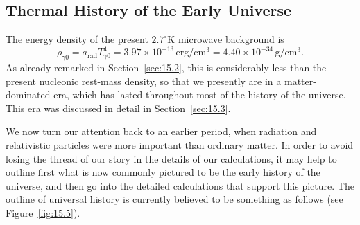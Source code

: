 
\subsection{Thermal History of the Early Universe}\label{sec:15.6}

The energy density of the present \(2.7^\circ\mathrm K\) microwave background
is
\begin{equation}
  \rho_{\gamma0}
  =
  a_{\mathrm{rad}}T_{\gamma0}^4
  =
  3.97\times10^{-13}\,\mathrm{erg/cm^3}
  =
  4.40\times10^{-34}\,\mathrm{g/cm^3}.
  \tag{15.6.1}\label{eq:15.6.1}
\end{equation}
As already remarked in Section~\ref{sec:15.2}, this is considerably less than
the present nucleonic rest-mass density, so that we presently are in a
matter-dominated era, which has lasted throughout most of the history of the
universe. This era was discussed in detail in Section~\ref{sec:15.3}.

We now turn our attention back to an earlier period, when radiation and
relativistic particles were more important than ordinary matter. In order to
avoid losing the thread of our story in the details of our calculations, it may
help to outline first what is now commonly pictured to be the early history of
the universe, and then go into the detailed calculations that support this
picture. The outline of universal history is currently believed to be something
as follows (see Figure~\ref{fig:15.5}).

